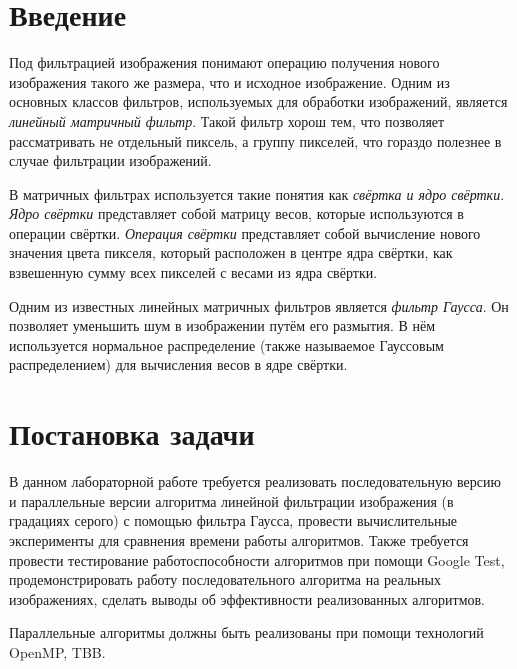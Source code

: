 \documentclass{report}
\begin{document}
\setcounter{page}{2}

\tableofcontents
\newpage

\section*{Введение}
\par Под фильтрацией изображения понимают операцию получения нового изображения такого же размера, что и исходное изображение. Одним из основных классов фильтров, используемых для обработки изображений, является \textit{линейный матричный фильтр}. Такой фильтр хорош тем, что позволяет рассматривать не отдельный пиксель, а группу пикселей, что гораздо полезнее в случае фильтрации изображений.
\par В матричных фильтрах используется такие понятия как \textit{свёртка и ядро свёртки}. \textit{Ядро свёртки} представляет собой матрицу весов, которые используются в операции свёртки. \textit{Операция свёртки} представляет собой вычисление нового значения цвета пикселя, который расположен в центре ядра свёртки, как взвешенную сумму всех пикселей с весами из ядра свёртки.
\par Одним из известных линейных матричных фильтров является \textit{фильтр Гаусса}. Он позволяет уменьшить шум в изображении путём его размытия. В нём используется нормальное распределение (также называемое Гауссовым распределением) для вычисления весов в ядре свёртки.
\newpage

\section*{Постановка задачи}
\par В данном лабораторной работе требуется реализовать последовательную версию и параллельные версии алгоритма линейной фильтрации изображения (в градациях серого) с помощью фильтра Гаусса, провести вычислительные эксперименты для сравнения времени работы алгоритмов. Также требуется провести тестирование работоспособности алгоритмов при помощи Google Test, продемонстрировать работу последовательного алгоритма на реальных изображениях, сделать выводы об эффективности реализованных алгоритмов.
\par Параллельные алгоритмы должны быть реализованы при помощи технологий OpenMP, TBB.
\newpage

\end{document}
